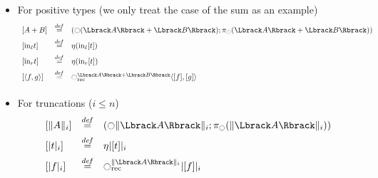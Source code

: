 \documentclass{beamer}
\newcommand \defeq {\overset{de\hspace{-0.2ex}f}{=}}
\newcommand{\modal}{\ensuremath{\ocircle}}
\begin{document}
\begin{frame}
  \begin{itemize}
  \item For positive types (we only treat the case of the sum as an example)
    \[
    \begin{array}{lcl}
      \left[  A+B \right] &\defeq& \left( \modal(\Lbrack A \Rbrack + \Lbrack B
        \Rbrack); \pi_\modal(\Lbrack A \Rbrack + \Lbrack B
        \Rbrack)\right)\\[0.5em]
      \left[  \mathrm{in}_\ell t \right] &\defeq& \eta (\mathrm{in}_\ell [t]) \\[0.5em]
      \left[  \mathrm{in}_r t \right] &\defeq& \eta (\mathrm{in}_r [t]) \\[0.5em]
      \left[ \langle f ,g\rangle\right] &\defeq& \modal_{\mathrm{rec}}^{\Lbrack A\Rbrack +
        \Lbrack B\Rbrack} \langle
      [f],[g]\rangle\\[0.5em]
    \end{array}
    \]
  \item For truncations ($i\leqslant n$)
    \[
    \begin{array}{lcl}
      \left[  \|A\|_i \right] &\defeq& (\modal \| \Lbrack A\Rbrack  \|_i;
      \pi_\modal(\| \Lbrack A\Rbrack
      \|_i)) \\[0.5em]
      \left[ |t|_i \right] &\defeq& \eta |[t]|_i \\[0.5em]
      \left[ |f|_i \right] &\defeq& \modal_{\mathrm{rec}}^{\| \Lbrack
        A\Rbrack  \|_i} | [f] |_i
    \end{array}
    \]

  \end{itemize}
\end{frame}
\end{document}
